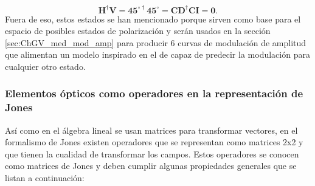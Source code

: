 \begin{equation*}
\mathbf{H^{\dagger}V} = \mathbf{45^{\circ\dagger}45^{\circ}} =
\mathbf{CD^{\dagger}CI = 0.}   
\end{equation*}
Fuera de eso, estos estados se han mencionado porque sirven como base para el espacio
de posibles estados de polarización y serán usados en la sección
\ref{sec:ChGV_med_mod_amp} para producir 6 curvas de modulación de
amplitud que alimentan un modelo inspirado en el de   capaz de predecir la modulación para
cualquier otro estado. 

\subsubsection{Elementos ópticos como operadores en la representación
  de Jones}

Así como en el álgebra lineal se usan matrices para transformar
vectores, en el formalismo de Jones existen operadores que se
representan como matrices 2x2 y que tienen la cualidad de
transformar los campos. Estos operadores se conocen como matrices de
Jones y deben cumplir algunas
propiedades generales  que se listan a continuación:

